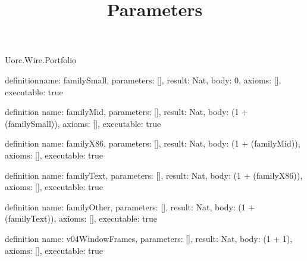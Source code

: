 \begin{lexlean}{Uorc.Wire.Portfolio}
\title{Parameters}
\begin{semanticmodule}
definition{name: familySmall, parameters: [], result: Nat, body: 0, axioms: [], executable: true}

definition{
  name: familyMid,
  parameters: [],
  result: Nat,
  body: (1 + (familySmall)),
  axioms: [],
  executable: true
}

definition{
  name: familyX86,
  parameters: [],
  result: Nat,
  body: (1 + (familyMid)),
  axioms: [],
  executable: true
}

definition{
  name: familyText,
  parameters: [],
  result: Nat,
  body: (1 + (familyX86)),
  axioms: [],
  executable: true
}

definition{
  name: familyOther,
  parameters: [],
  result: Nat,
  body: (1 + (familyText)),
  axioms: [],
  executable: true
}

definition{
  name: v04WindowFrames,
  parameters: [],
  result: Nat,
  body: (1 + 1),
  axioms: [],
  executable: true
}
\end{semanticmodule}
\end{lexlean}
